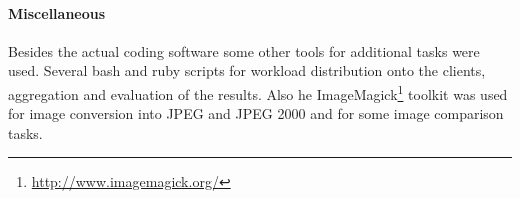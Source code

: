 \paragraph{Miscellaneous}
Besides the actual coding software some other tools for
additional tasks were used. Several bash and ruby scripts for workload
distribution onto the clients, aggregation and evaluation of the results.
Also he ImageMagick\footnote{\url{http://www.imagemagick.org/}} toolkit was used
for image conversion into JPEG and JPEG 2000 and for some image comparison
tasks.


